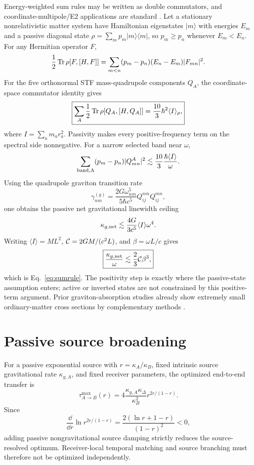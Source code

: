 Energy-weighted sum rules may be written as double commutators, and coordinate-multipole/E2 applications are standard \cite{LuJohnson2018,Hinohara2019}. Let a stationary nonrelativistic matter system have Hamiltonian eigenstates $|m\rangle$ with energies $E_m$ and a passive diagonal state $\rho=\sum_m p_m|m\rangle\langle m|$, so $p_m\ge p_n$ whenever $E_m<E_n$. For any Hermitian operator $F$,
\begin{equation}
\frac12\operatorname{Tr}\rho[F,[H,F]]
=\sum_{m<n}(p_m-p_n)(E_n-E_m)|F_{mn}|^2.
\end{equation}
For the five orthonormal STF mass-quadrupole components $Q_A$, the coordinate-space commutator identity gives
\begin{equation}
\boxed{
\sum_A\frac12\operatorname{Tr}\rho[Q_A,[H,Q_A]]
=\frac{10}{3}\hbar^2\langle I\rangle_\rho,}
\end{equation}
where $I=\sum_a m_a r_a^2$. Passivity makes every positive-frequency term on the spectral side nonnegative. For a narrow selected band near $\omega$,
\begin{equation}
\sum_{\rm band,A}(p_m-p_n)|Q^A_{mn}|^2
\lesssim\frac{10}{3}\frac{\hbar\langle I\rangle}{\omega}.
\end{equation}
Using the quadrupole graviton transition rate
\begin{equation}
\gamma_{nm}^{(g)}
=\frac{2G\omega_{nm}^5}{5\hbar c^5}
Q_{ij}^{nm}Q_{ij}^{mn},
\end{equation}
one obtains the passive net gravitational linewidth ceiling
\begin{equation}
\kappa_{g,\rm net}
\lesssim\frac{4G}{3c^5}\langle I\rangle\omega^4.
\end{equation}
Writing $\langle I\rangle=ML^2$, $\mathcal C=2GM/(c^2L)$, and $\beta=\omega L/c$ gives
\begin{equation}
\boxed{
\frac{\kappa_{g,\rm net}}{\omega}
\lesssim\frac23\mathcal C\beta^3,}
\end{equation}
which is Eq.~\eqref{eq:sumrule}. The positivity step is exactly where the passive-state assumption enters; active or inverted states are not constrained by this positive-term argument. Prior graviton-absorption studies already show extremely small ordinary-matter cross sections by complementary methods \cite{BoughnRothman2006,PalessandroSloth2020}.

\section{Passive source broadening}
\label{app:broadening}

For a passive exponential source with $r=\kappa_A/\kappa_B$, fixed intrinsic source gravitational rate $\kappa_{g,A}$, and fixed receiver parameters, the optimized end-to-end transfer is
\begin{equation}
\tau_{A\to B}^{\max}(r)
=4\frac{\kappa_{g,A}\kappa_\Delta}{\kappa_B^2}
r^{2r/(1-r)}.
\end{equation}
Since
\begin{equation}
\frac{\dd}{\dd r}\ln r^{2r/(1-r)}
=\frac{2(\ln r+1-r)}{(1-r)^2}<0,
\end{equation}
adding passive nongravitational source damping strictly reduces the source-resolved optimum. Receiver-local temporal matching and source branching must therefore not be optimized independently.
